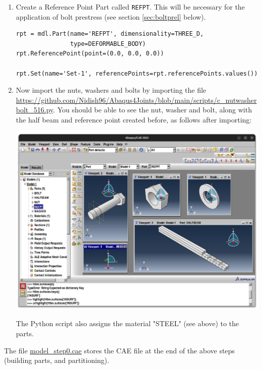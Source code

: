 \documentclass[11pt]{article}
\begin{document}
\begin{enumerate}
\item Create a Reference Point Part called \texttt{REFPT}.
This will be necessary for the application of bolt prestress (see section \ref{sec:boltprel} below).
\begin{verbatim}
rpt = mdl.Part(name='REFPT', dimensionality=THREE_D, 
               type=DEFORMABLE_BODY)
rpt.ReferencePoint(point=(0.0, 0.0, 0.0))

rpt.Set(name='Set-1', referencePoints=rpt.referencePoints.values())
\end{verbatim}
\item Now import the nuts, washers and bolts by importing the file \url{https://github.com/Nidish96/Abaqus4Joints/blob/main/scripts/c\_nutwasherbolt\_516.py}.
You should be able to see the nut, washer and bolt, along with the half beam and reference point created before, as follows after importing:
\begin{center}
\includegraphics[width=.9\linewidth]{./figs/nwb.png}
\end{center}
The Python script also assigns the material "STEEL" (see above) to the parts.
\end{enumerate}

The file \href{https://github.com/Nidish96/Abaqus4Joints/blob/main/assets/assembly/model\_step0.cae}{model\_step0.cae} stores the CAE file at the end of the above steps (building parts, and partitioning).
\end{document}
